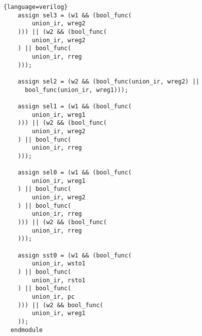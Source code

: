 \begin{lstlisting}{language=verilog}
    assign sel3 = (w1 && (bool_func(
        union_ir, wreg2
    ))) || (w2 && (bool_func(
        union_ir, wreg2
    ) || bool_func(
        union_ir, rreg
    )));
  
    assign sel2 = (w2 && (bool_func(union_ir, wreg2) ||
      bool_func(union_ir, wreg1)));
  
    assign sel1 = (w1 && (bool_func(
        union_ir, wreg1
    ))) || (w2 && (bool_func(
        union_ir, wreg2
    ) || bool_func(
        union_ir, rreg
    )));
  
    assign sel0 = (w1 && (bool_func(
        union_ir, wreg1
    ) || bool_func(
        union_ir, wreg2
    ) || bool_func(
        union_ir, rreg
    ))) || (w2 && (bool_func(
        union_ir, rreg
    )));
  
    assign sst0 = (w1 && (bool_func(
        union_ir, wsto1
    ) || bool_func(
        union_ir, rsto1
    ) || bool_func(
        union_ir, pc
    ))) || (w2 && bool_func(
        union_ir, wreg1
    ));
  endmodule
\end{lstlisting}